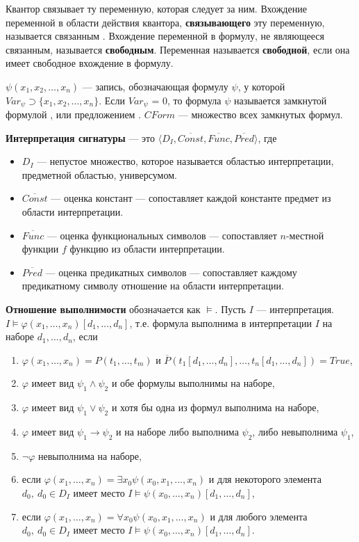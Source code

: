 Квантор связывает ту переменную, которая следует за ним.
Вхождение переменной в области действия квантора, \textbf{связывающего} эту переменную, называется связанным .
Вхождение переменной в формулу, не являющееся связанным, называется \textbf{свободным}.
Переменная называется \textbf{свободной}, если она имеет свободное вхождение в формулу.

$\psi(x_1, x_2,\ldots, x_n)$ — запись, обозначающая формулу $\psi$, у которой $ Var_{\psi} \supset \{x_1, x_2,..., x_n\}$.
Если ${Var}_{\psi}$ = 0, то формула $\psi$ называется
замкнутой формулой , или предложением .
$CForm$ — множество всех замкнутых формул.

\textbf{Интерпретация сигнатуры} --- это $\langle D_I, \overline{Const}, \overline{Func}, \overline{Pred} \rangle$, где
    \begin{itemize}
        \item $D_I$ --- непустое множество, которое называется областью интерпретации, предметной областью, универсумом.
        \item $\overline{Const}$ --- оценка констант --- сопоставляет каждой константе предмет из области интерпретации.
        \item $\overline{Func}$ --- оценка функциональных символов --- сопоставляет $n$-местной функции $f$ функцию из области интерпретации.
        \item $\overline{Pred}$ --- оценка предикатных символов --- сопоставляет каждому предикатному символу отношение на области интерпретации.
    \end{itemize}
    

\textbf{Отношение выполнимости} обозначается как $\models$.
Пусть $I$ --- интерпретация.
\newline $I \models \varphi(x_1 , \dots, x_n)[d_1 , \dots, d_n]$, т.е. формула выполнима в интерпретации $I$ на наборе $d_1, \dots, d_n$, если
\begin{enumerate}
    \item $\varphi(x_1, \dots, x_n) = P(t_1, \dots, t_m)$ и $ \overline{P} \left(t_1 [d_1 , \dots, d_n], \dots, t_n [d_1 , \dots, d_n]\right) = True $,
    \item $\varphi$ имеет вид $\psi_1 \wedge \psi_2$ и обе формулы выполнимы на наборе,
    \item $\varphi$ имеет вид $\psi_1 \vee \psi_2$ и хотя бы одна из формул выполнима на наборе,
    \item $\varphi$ имеет вид $\psi_1 \rightarrow \psi_2$ и на наборе либо выполнима $\psi_2$, либо невыполнима $\psi_1$,
    \item $\neg \varphi$ невыполнима на наборе,
    \item если $\varphi(x_1, \dots, x_n) = \exists x_0 \psi(x_0, x_1, \dots, x_n)$ и для некоторого элемента $d_0,~d_0 \in D_I$ имеет место $I \models \psi(x_0, \dots, x_n)[d_1, \dots, d_n]$,
    \item если $\varphi(x_1, \dots, x_n) = \forall x_0 \psi(x_0, x_1, \dots, x_n)$ и для любого элемента $d_0,~d_0 \in D_I$ имеет место $I \models \psi(x_0, \dots, x_n)[d_1, \dots, d_n]$.
\end{enumerate}

